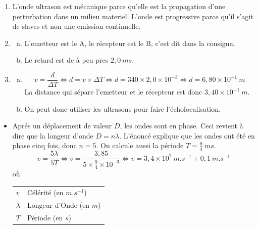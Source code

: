 \documentclass[12pt, a4paper]{article}
\makeatletter
\newenvironment{conditions}
  {\par\vspace{\abovedisplayskip}\noindent\begin{tabular}{>{$}l<{$} @{${\quad}={\quad}$} l}}
  {\end{tabular}\par\vspace{\belowdisplayskip}}
\makeatother
\begin{document}
    \begin{Exercise}[number={27}]
        \begin{enumerate}[1.]
            \item L'onde ultrason est mécanique parce qu'elle est la propagation d'une perturbation dans un milieu materiel. L'onde est progressive parce qu'il s'agit de slaves et non une emission continuelle.
            \item   \begin{enumerate}[a.]
                        \item L'emetteur est le {A}, le récepteur est le {B}, c'est dit dans la consigne.
                        \item Le retard est de à peu pres $2{,}0\ \si{ms}$.
                    \end{enumerate}
            \item   \begin{enumerate}[a.]
                        \item   \begin{equation*}
                                    v=\frac{d}{\Delta T}
                                    \iff d=v\times\Delta T
                                    \iff d=340\times 2{,}0\times 10^{-3}
                                    \iff d=6{,}80\times 10^{-1}\ \si{m}
                                \end{equation*}
                                La distance qui sépare l'emetteur et le récepteur est donc $3{,}40\times 10^{-1}\ \si{m}$.
                        \item On peut donc utiliser les ultrasons pour faire l'écholocalisation.
                    \end{enumerate}
        \end{enumerate}
    \end{Exercise}

    \begin{Exercise}[number={28}]
        \begin{itemize}
            \item[] Aprés un déplacement de valeur $D$, les ondes sont en phase. Ceci revient à dire que la longeur d'onde $D=n\lambda$. L'énoncé explique que les ondes ont été en phase cinq fois, donc $n=5$. On calcule aussi la période $T=\frac{9}{4}\ \si{ms}$.
            \begin{equation*}
                v=\frac{5\lambda}{5T}
                \iff v=\frac{3{,}85}{5\times\frac{9}{4}\times 10^{-3}}
                \iff v=3{,}4\times 10^2\ \si{m.s^{-1}} \pm 0{,}1\ \si{m.s^{-1}}
            \end{equation*} où
            \begin{conditions}
                v & Célérité (en $\si{m.s^{-1}}$) \\ 
                \lambda & Longeur d'Onde (en $\si{m}$) \\
                T & Période (en $\si{s}$) 
            \end{conditions}
        \end{itemize}
    \end{Exercise}
\end{document}
